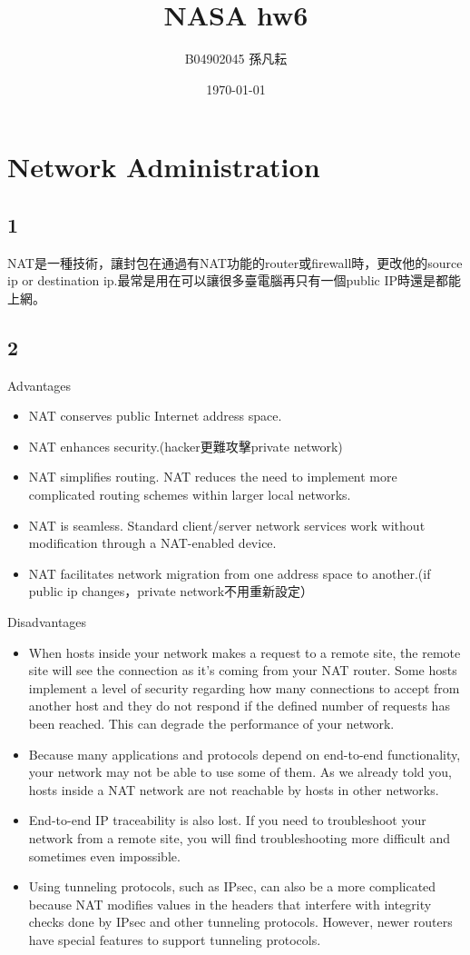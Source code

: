 \documentclass{article}
\title{NASA hw6}
\author{B04902045 孫凡耘}
\date{\today}
\begin{document}
\maketitle
    \section{Network Administration}
    \subsection{1}
    NAT是一種技術，讓封包在通過有NAT功能的router或firewall時，更改他的source ip or destination ip.最常是用在可以讓很多臺電腦再只有一個public IP時還是都能上網。
    \subsection{2}
    Advantages
\begin{itemize}
\item NAT conserves public Internet address space.
\item NAT enhances security.(hacker更難攻擊private network)
\item NAT simplifies routing. NAT reduces the need to implement more complicated routing schemes within larger local networks.
\item NAT is seamless. Standard client/server network services work without modification through a NAT-enabled device.
\item NAT facilitates network migration from one address space to another.(if public ip changes，private network不用重新設定）
\end{itemize}
Disadvantages
\begin{itemize}
\item When hosts inside your network makes a request to a remote site, the remote site will see the connection as it’s coming from your NAT router. Some hosts implement a level of security regarding how many connections to accept from another host and they do not respond if the defined number of requests has been reached. This can degrade the performance of your network.
\item Because many applications and protocols depend on end-to-end functionality, your network may not be able to use some of them. As we already told you, hosts inside a NAT network are not reachable by hosts in other networks.
\item End-to-end IP traceability is also lost. If you need to troubleshoot your network from a remote site, you will find troubleshooting more difficult and sometimes even impossible.
\item Using tunneling protocols, such as IPsec, can also be a more complicated because NAT modifies values in the headers that interfere with integrity checks done by IPsec and other tunneling protocols. However, newer routers have special features to support tunneling protocols.
\end{itemize}
\end{document}
